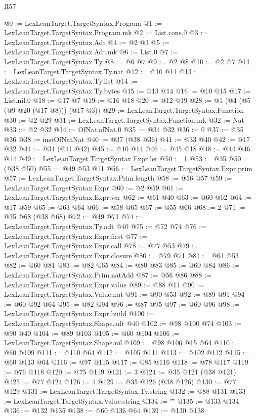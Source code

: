 \begin{lexlean}{R57}
\begin{coremodule}
@0 := LexLeanTarget.TargetSyntax.Program
@1 := LexLeanTarget.TargetSyntax.Program.mk
@2 := List.cons.{0}
@3 := LexLeanTarget.TargetSyntax.Adt
@4 := @2 @3
@5 := LexLeanTarget.TargetSyntax.Adt.mk
@6 := List.{0}
@7 := LexLeanTarget.TargetSyntax.Ty
@8 := @6 @7
@9 := @2 @8
@10 := @2 @7
@11 := LexLeanTarget.TargetSyntax.Ty.nat
@12 := @10 @11
@13 := LexLeanTarget.TargetSyntax.Ty.list
@14 := LexLeanTarget.TargetSyntax.Ty.bytes
@15 := @13 @14
@16 := @10 @15
@17 := List.nil.{0}
@18 := @17 @7
@19 := @16 @18
@20 := @12 @19
@28 := @1 (@4 (@5 (@9 @20 (@17 @8))) (@17 @3))
@29 := LexLeanTarget.TargetSyntax.Function
@30 := @2 @29
@31 := LexLeanTarget.TargetSyntax.Function.mk
@32 := Nat
@33 := @2 @32
@34 := OfNat.ofNat.{0}
@35 := @34 @32
@36 := 0
@37 := @35 @36
@38 := instOfNatNat
@40 := @37 (@38 @36)
@41 := @33 @40
@42 := @17 @32
@44 := @31 (@41 @42)
@45 := @10 @14
@46 := @45 @18
@48 := @44 @46 @14
@49 := LexLeanTarget.TargetSyntax.Expr.let
@50 := 1
@53 := @35 @50 (@38 @50)
@55 := @49 @53 @11
@56 := LexLeanTarget.TargetSyntax.Expr.prim
@57 := LexLeanTarget.TargetSyntax.Prim.length
@58 := @56 @57
@59 := LexLeanTarget.TargetSyntax.Expr
@60 := @2 @59
@61 := LexLeanTarget.TargetSyntax.Expr.var
@62 := @61 @40
@63 := @60 @62
@64 := @17 @59
@65 := @63 @64
@66 := @58 @65
@67 := @55 @66
@68 := 2
@71 := @35 @68 (@38 @68)
@72 := @49 @71
@74 := LexLeanTarget.TargetSyntax.Ty.adt @40
@75 := @72 @74
@76 := LexLeanTarget.TargetSyntax.Expr.first
@77 := LexLeanTarget.TargetSyntax.Expr.call
@78 := @77 @53
@79 := LexLeanTarget.TargetSyntax.Expr.closure
@80 := @79 @71
@81 := @61 @53
@82 := @60 @81
@83 := @82 @65
@84 := @80 @83
@85 := @60 @84
@86 := LexLeanTarget.TargetSyntax.Prim.natAdd
@87 := @56 @86
@88 := LexLeanTarget.TargetSyntax.Expr.value
@89 := @88 @11
@90 := LexLeanTarget.TargetSyntax.Value.nat
@91 := @90 @53
@92 := @89 @91
@94 := @60 @92 @64
@95 := @82 @94
@96 := @87 @95
@97 := @60 @96
@98 := LexLeanTarget.TargetSyntax.Expr.build
@100 := LexLeanTarget.TargetSyntax.Shape.adt @40
@102 := @98 @100 @74
@103 := @90 @40
@104 := @89 @103
@105 := @60 @104
@106 := LexLeanTarget.TargetSyntax.Shape.nil
@109 := @98 @106 @15 @64
@110 := @60 @109
@111 := @110 @64
@112 := @105 @111
@113 := @102 @112
@115 := @60 @113 @64
@116 := @97 @115
@117 := @85 @116
@118 := @78 @117
@119 := @76 @118
@120 := @75 @119
@121 := 3
@124 := @35 @121 (@38 @121)
@125 := @77 @124
@126 := 4
@129 := @35 @126 (@38 @126)
@130 := @77 @129
@131 := LexLeanTarget.TargetSyntax.Ty.string
@132 := @88 @131
@133 := LexLeanTarget.TargetSyntax.Value.string
@134 := "\""
@135 := @133 @134
@136 := @132 @135
@138 := @60 @136 @64
@139 := @130 @138

\end{coremodule}
\end{lexlean}
